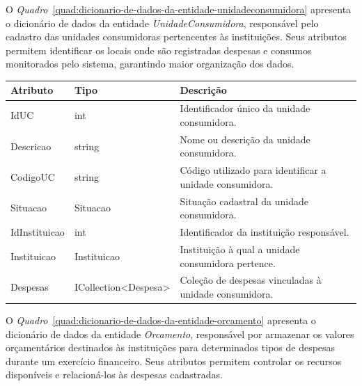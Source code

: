 O \textit{Quadro}~\ref{quad:dicionario-de-dados-da-entidade-unidadeconsumidora} apresenta o dicionário de dados da entidade \textit{UnidadeConsumidora}, responsável pelo cadastro das unidades consumidoras pertencentes às instituições. Seus atributos permitem identificar os locais onde são registradas despesas e consumos monitorados pelo sistema, garantindo maior organização dos dados.

\begin{quadro}[H]
\caption[Dicionário de dados da entidade UnidadeConsumidora]{Dicionário de dados da entidade UnidadeConsumidora}
\label{quad:dicionario-de-dados-da-entidade-unidadeconsumidora}

\begin{tabular}{|p{}|p{}|p{}|}
\hline
\textbf{Atributo} & \textbf{Tipo} & \textbf{Descrição} \\ 
\hline
IdUC & int & Identificador único da unidade consumidora. \\ 
\hline
Descricao & string & Nome ou descrição da unidade consumidora. \\ 
\hline
CodigoUC & string & Código utilizado para identificar a unidade consumidora. \\ 
\hline
Situacao & Situacao & Situação cadastral da unidade consumidora. \\ 
\hline
IdInstituicao & int & Identificador da instituição responsável. \\ 
\hline
Instituicao & Instituicao & Instituição à qual a unidade consumidora pertence. \\ 
\hline
Despesas & ICollection<Despesa> & Coleção de despesas vinculadas à unidade consumidora. \\ 
\hline
\end{tabular}


\end{quadro}



O \textit{Quadro}~\ref{quad:dicionario-de-dados-da-entidade-orcamento} apresenta o dicionário de dados da entidade \textit{Orcamento}, responsável por armazenar os valores orçamentários destinados às instituições para determinados tipos de despesas durante um exercício financeiro. Seus atributos permitem controlar os recursos disponíveis e relacioná-los às despesas cadastradas.

